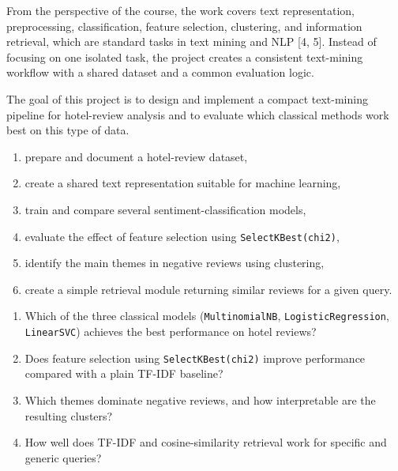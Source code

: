 \documentclass[twoside, 12pt]{article}
\begin{document}
From the perspective of the course, the work covers text representation, preprocessing, classification, feature selection, clustering, and information retrieval, which are standard tasks in text mining and NLP [4, 5]. Instead of focusing on one isolated task, the project creates a consistent text-mining workflow with a shared dataset and a common evaluation logic.


The goal of this project is to design and implement a compact text-mining pipeline for hotel-review analysis and to evaluate which classical methods work best on this type of data.


\begin{enumerate}
    \item prepare and document a hotel-review dataset,
    \item create a shared text representation suitable for machine learning,
    \item train and compare several sentiment-classification models,
    \item evaluate the effect of feature selection using \texttt{SelectKBest(chi2)},
    \item identify the main themes in negative reviews using clustering,
    \item create a simple retrieval module returning similar reviews for a given query.
\end{enumerate}


\begin{enumerate}
    \item Which of the three classical models (\texttt{MultinomialNB}, \texttt{LogisticRegression}, \texttt{LinearSVC}) achieves the best performance on hotel reviews?
    \item Does feature selection using \texttt{SelectKBest(chi2)} improve performance compared with a plain TF-IDF baseline?
    \item Which themes dominate negative reviews, and how interpretable are the resulting clusters?
    \item How well does TF-IDF and cosine-similarity retrieval work for specific and generic queries?
\end{enumerate}


\end{document}
